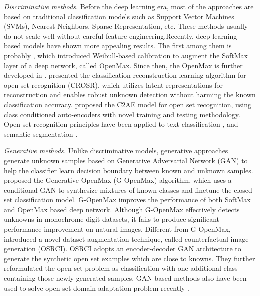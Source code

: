 \documentclass[runningheads]{llncs}
\begin{document}
\textit{Discriminative methods.} Before the deep learning era, most of the approaches \cite{scholkopf2000support,scheirer2014probability,junior2017nearest,zhang2016sparse} are based on traditional classification models such as Support Vector Machines (SVMs), Nearest Neighbors, Sparse Representation, etc. These methods usually do not scale well without careful feature engineering.Recently, deep learning based models have shown more appealing results. The first among them is probably \cite{bendale2016towards}, which introduced Weibull-based calibration to augment the SoftMax layer of a deep network, called OpenMax. Since then, the OpenMax is further developed in \cite{rozsa2017adversarial,ge2017generative}. \cite{yoshihashi2019classification} presented the classification-reconstruction learning algorithm for open set recognition (CROSR), which utilizes latent representations for reconstruction and enables robust unknown detection without harming the known classification accuracy. \cite{oza2019c2ae} proposed the C2AE model
for open set recognition, using class conditioned auto-encoders with novel training and testing methodology. Open set recognition principles have been applied to text classification \cite{venkataram2018open,shu2017doc}, and semantic segmentation \cite{bev2019simultaneous}.

\textit{Generative methods.} Unlike discriminative models, generative approaches generate unknown samples based on Generative Adversarial Network (GAN) \cite{goodfellow2014generative} to help the classifier learn decision boundary between known and unknown samples. \cite{ge2017generative} proposed the Generative OpenMax (G-OpenMax) algorithm, which uses a conditional GAN to synthesize mixtures of known classes and finetune the closed-set classification model. G-OpenMax improves the performance of both SoftMax and OpenMax based deep network. Although G-OpenMax effectively detects unknowns in monochrome digit datasets, it fails to produce significant performance improvement on natural images. Different from G-OpenMax, \cite{neal2018open} introduced a novel dataset augmentation technique, called counterfactual image generation (OSRCI). OSRCI adopts an encoder-decoder GAN architecture to generate the synthetic open set examples which are close to knowns. They further reformulated the open set problem as classification with one additional class containing those newly generated samples. GAN-based methods also have been used to solve open set domain adaptation problem recently \cite{zhang2019improving,saito2018open}.
\end{document}
